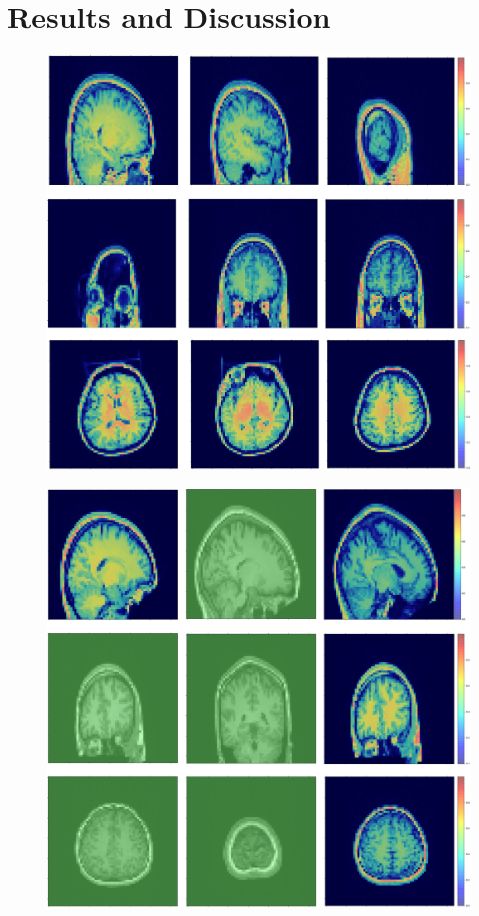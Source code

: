 \documentclass[runningheads]{llncs}
\begin{document}
\section{Results and Discussion}
\begin{figure}
 \centering
 \label{fig:faceCAM}
 \includegraphics[width=1\textwidth]{images/faceCAM.png}
 \caption{}
\end{figure}

\begin{figure}
 \centering
 \label{fig:defaceCAM}
 \includegraphics[width=1\textwidth]{images/defaceCAM.png}
 \caption{}
\end{figure}
\end{document}
